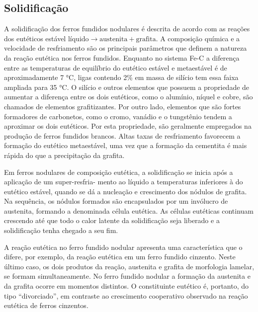 \subsection{Solidifica\c{c}\~{a}o}

A solidificação dos ferros fundidos nodulares é descrita de acordo com as reações dos eutéticos estável $\text{líquido} \rightarrow \text{austenita} + \text{grafita}$. A composição química e a velocidade de resfriamento são os principais parâmetros que definem a natureza da reação eutética nos ferros fundidos. Enquanto no sistema Fe-C a diferença entre as temperaturas de equilíbrio do eutético estável e metaestável é de aproximadamente 7 °C, ligas contendo 2\% em massa de silício tem essa faixa ampliada para 35 °C\cite{Santos1991}. O silício e outros elementos que possuem a propriedade de aumentar a diferença entre os dois eutéticos, como o alumínio, níquel e cobre, são chamados de elementos grafitizantes. Por outro lado, elementos que são fortes formadores de carbonetos, como o cromo, vanádio e o tungstênio tendem a aproximar os dois eutéticos. Por esta propriedade, são geralmente empregados na produção de ferros fundidos brancos. Altas taxas de resfriamento favorecem a formação do eutético metaestável, uma vez que a formação da cementita é mais rápida do que a precipitação da grafita.

Em ferros nodulares de composição eutética, a solidificação se inicia após a aplicação de um super-resfria-%
mento ao líquido a temperaturas inferiores à do eutético estável, quando se dá a nucleação e crescimento dos nódulos de grafita. Na sequência, os nódulos formados são encapsulados por um invólucro de austenita, formando a denominada célula eutética. As células eutéticas continuam crescendo até que todo o calor latente da solidificação seja liberado e a solidificação tenha chegado a seu fim\cite{Santos1991}. %

A reação eutética no ferro fundido nodular apresenta uma característica que o difere, por exemplo, da reação eutética em um ferro fundido cinzento. Neste último caso, os dois produtos da reação, austenita e grafita de morfologia lamelar, se formam simultaneamente. No ferro fundido nodular a formação da austenita e da grafita ocorre em momentos distintos. O constituinte eutético é, portanto, do tipo ``divorciado'', em contraste ao crescimento cooperativo observado na reação eutética de ferros cinzentos\cite{Santos1991}.

